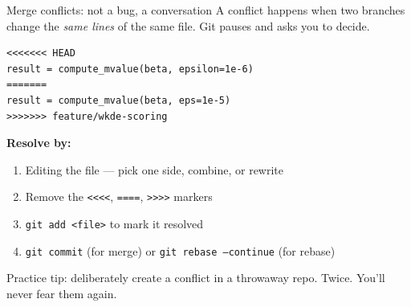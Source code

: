 \documentclass[10pt,aspectratio=169]{beamer}
\begin{document}
\begin{frame}[fragile]{Merge conflicts: not a bug, a conversation}
  A conflict happens when two branches change the \emph{same lines} of the
  same file. Git pauses and asks you to decide.

\begin{lstlisting}
<<<<<<< HEAD
result = compute_mvalue(beta, epsilon=1e-6)
=======
result = compute_mvalue(beta, eps=1e-5)
>>>>>>> feature/wkde-scoring
\end{lstlisting}

  \textbf{Resolve by:}
  \begin{enumerate}
    \item Editing the file --- pick one side, combine, or rewrite
    \item Remove the \texttt{<<<<}, \texttt{====}, \texttt{>>>>} markers
    \item \texttt{git add <file>} to mark it resolved
    \item \texttt{git commit} (for merge) or \texttt{git rebase --continue} (for rebase)
  \end{enumerate}

  \vspace{0.4em}
  \begin{center}
    \footnotesize\color{ghMuted}
    Practice tip: deliberately create a conflict in a throwaway repo. Twice. You'll never fear them again.
  \end{center}
\end{frame}
\end{document}
